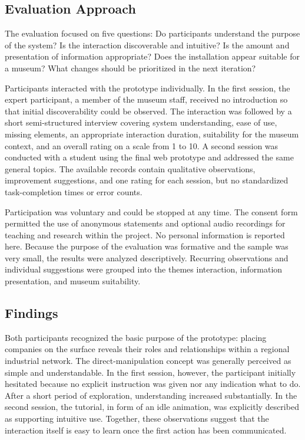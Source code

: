 \documentclass[sigconf,nonacm]{acmart}
\begin{document}
\subsection{Evaluation Approach}

The evaluation focused on five questions: Do participants understand the purpose of the system? Is the interaction discoverable and intuitive? Is the amount and presentation of information appropriate? Does the installation appear suitable for a museum? What changes should be prioritized in the next iteration?

Participants interacted with the prototype individually. In the first session, the expert participant, a member of the museum staff, received no introduction so that initial discoverability could be observed. The interaction was followed by a short semi-structured interview covering system understanding, ease of use, missing elements, an appropriate interaction duration, suitability for the museum context, and an overall rating on a scale from 1 to 10. A second session was conducted with a student using the final web prototype and addressed the same general topics. The available records contain qualitative observations, improvement suggestions, and one rating for each session, but no standardized task-completion times or error counts.

Participation was voluntary and could be stopped at any time. The consent form permitted the use of anonymous statements and optional audio recordings for teaching and research within the project. No personal information is reported here. Because the purpose of the evaluation was formative and the sample was very small, the results were analyzed descriptively. Recurring observations and individual suggestions were grouped into the themes interaction, information presentation, and museum suitability.

\subsection{Findings}

Both participants recognized the basic purpose of the prototype: placing companies on the surface reveals their roles and relationships within a regional industrial network. The direct-manipulation concept was generally perceived as simple and understandable. In the first session, however, the participant initially hesitated because no explicit instruction was given nor any indication what to do. After a short period of exploration, understanding increased substantially. In the second session, the tutorial, in form of an idle animation, was explicitly described as supporting intuitive use. Together, these observations suggest that the interaction itself is easy to learn once the first action has been communicated.
\end{document}
